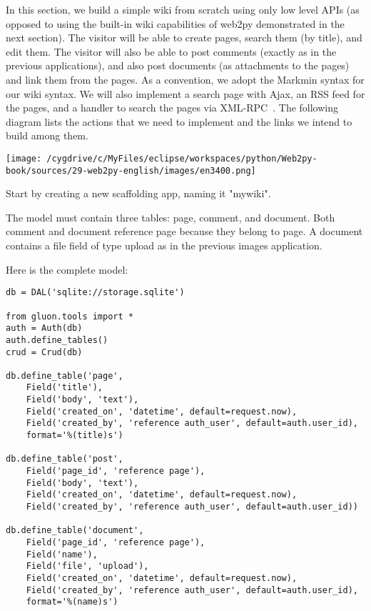 \documentclass[justified,sixbynine,notoc]{tufte-book}
\def\inxx#1{\index{#1}}
\begin{document}
\begin{fullwidth}
\inxx{wiki} \inxx{RSS} \inxx{Ajax} \inxx{XMLRPC}

In this section, we build a simple wiki from scratch using only low level APIs (as opposed to using the built-in wiki capabilities of web2py demonstrated in the next section). The visitor will be able to create pages, search them (by title), and edit them. The visitor will also be able to post comments (exactly as in the previous applications), and also post documents (as attachments to the pages) and link them from the pages. As a convention, we adopt the Markmin syntax for our wiki syntax. We will also implement a search page with Ajax, an RSS feed for the pages, and a handler to search the pages via XML-RPC~\cite{xmlrpc}. The following diagram lists the actions that we need to implement and the links we intend to build among them.


\goodbreak\begin{center}\texttt{[image: /cygdrive/c/MyFiles/eclipse/workspaces/python/Web2py-book/sources/29-web2py-english/images/en3400.png]}\end{center}


Start by creating a new scaffolding app, naming it "mywiki".

The model must contain three tables: page, comment, and document. Both comment and document reference page because they belong to page. A document contains a file field of type upload as in the previous images application.

Here is the complete model:
\begin{lstlisting}
db = DAL('sqlite://storage.sqlite')

from gluon.tools import *
auth = Auth(db)
auth.define_tables()
crud = Crud(db)

db.define_table('page',
    Field('title'),
    Field('body', 'text'),
    Field('created_on', 'datetime', default=request.now),
    Field('created_by', 'reference auth_user', default=auth.user_id),
    format='%(title)s')

db.define_table('post',
    Field('page_id', 'reference page'),
    Field('body', 'text'),
    Field('created_on', 'datetime', default=request.now),
    Field('created_by', 'reference auth_user', default=auth.user_id))

db.define_table('document',
    Field('page_id', 'reference page'),
    Field('name'),
    Field('file', 'upload'),
    Field('created_on', 'datetime', default=request.now),
    Field('created_by', 'reference auth_user', default=auth.user_id),
    format='%(name)s')


\end{lstlisting}
\end{fullwidth}
\end{document}
